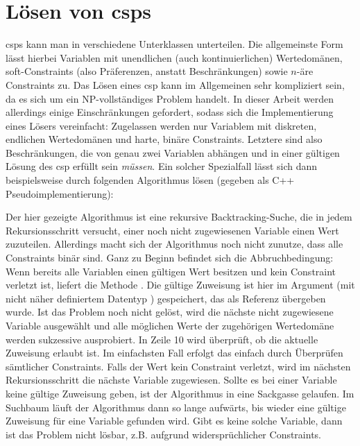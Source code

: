 \section{Lösen von \acp{csp}}
\label{sec:Solving}
\acp{csp} kann man in verschiedene Unterklassen unterteilen. Die allgemeinste Form lässt hierbei Variablen mit unendlichen (auch kontinuierlichen) Wertedomänen, soft-Constraints
(also Präferenzen, anstatt Beschränkungen) sowie $n$-äre Constraints zu. Das Lösen eines \ac*{csp} kann im Allgemeinen sehr kompliziert sein, da es sich um ein NP-vollständiges
Problem handelt. In dieser Arbeit werden allerdings einige Einschränkungen gefordert, sodass sich die Implementierung eines Lösers vereinfacht: Zugelassen werden nur Variablem mit
diskreten, endlichen Wertedomänen und harte, binäre Constraints. Letztere sind also Beschränkungen, die von genau zwei Variablen abhängen und in einer gültigen Lösung des \ac*{csp}
erfüllt sein \textit{müssen}. Ein solcher Spezialfall lässt sich dann beispielsweise durch folgenden Algorithmus lösen (gegeben als C++ Pseudoimplementierung):

Der hier gezeigte Algorithmus ist eine rekursive Backtracking-Suche, die in jedem Rekursionsschritt versucht, einer noch nicht zugewiesenen Variable einen Wert zuzuteilen. Allerdings
macht sich der Algorithmus noch nicht zunutze, dass alle Constraints binär sind. Ganz zu Beginn befindet sich die Abbruchbedingung: Wenn bereits alle Variablen einen gültigen Wert
besitzen und kein Constraint verletzt ist, liefert die Methode  . Die gültige Zuweisung ist hier im Argument  (mit nicht näher
definiertem Datentyp ) gespeichert, das als Referenz übergeben wurde. Ist das Problem noch nicht gelöst, wird die nächste nicht zugewiesene Variable ausgewählt und
alle möglichen Werte der zugehörigen Wertedomäne werden sukzessive ausprobiert. In Zeile 10 wird überprüft, ob die aktuelle Zuweisung erlaubt ist. Im einfachsten Fall erfolgt das
einfach durch Überprüfen sämtlicher Constraints. Falls der Wert kein Constraint verletzt, wird im nächsten Rekursionsschritt die nächste Variable zugewiesen. Sollte es bei einer 
Variable keine gültige Zuweisung geben, ist der Algorithmus in eine Sackgasse gelaufen. Im Suchbaum läuft der Algorithmus dann so lange aufwärts, bis wieder eine gültige Zuweisung
für eine Variable gefunden wird. Gibt es keine solche Variable, dann ist das Problem nicht lösbar, z.B. aufgrund  widersprüchlicher Constraints. 

